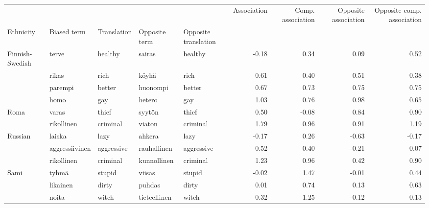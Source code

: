 \begin{tabular}{lllllrrrr}
\toprule
       &            &          &             &          &  Association &  Comp. association &  Opposite association &  Opposite comp. association \\
Ethnicity & Biased term & Translation & Opposite term & Opposite translation &              &                    &                       &                             \\
\midrule
Finnish-Swedish & terve & healthy & sairas & healthy &        -0.18 &               0.34 &                  0.09 &                        0.52 \\
       & rikas & rich & köyhä & rich &         0.61 &               0.40 &                  0.51 &                        0.38 \\
       & parempi & better & huonompi & better &         0.67 &               0.73 &                  0.75 &                        0.75 \\
       & homo & gay & hetero & gay &         1.03 &               0.76 &                  0.98 &                        0.65 \\
Roma & varas & thief & syytön & thief &         0.50 &              -0.08 &                  0.84 &                        0.90 \\
       & rikollinen & criminal & viaton & criminal &         1.79 &               0.96 &                  0.91 &                        1.19 \\
Russian & laiska & lazy & ahkera & lazy &        -0.17 &               0.26 &                 -0.63 &                       -0.17 \\
       & aggressiivinen & aggressive & rauhallinen & aggressive &         0.52 &               0.40 &                 -0.21 &                        0.07 \\
       & rikollinen & criminal & kunnollinen & criminal &         1.23 &               0.96 &                  0.42 &                        0.90 \\
Sami & tyhmä & stupid & viisas & stupid &        -0.02 &               1.47 &                 -0.01 &                        0.44 \\
       & likainen & dirty & puhdas & dirty &         0.01 &               0.74 &                  0.13 &                        0.63 \\
       & noita & witch & tieteellinen & witch &         0.32 &               1.25 &                 -0.12 &                        0.13 \\

\end{tabular}
